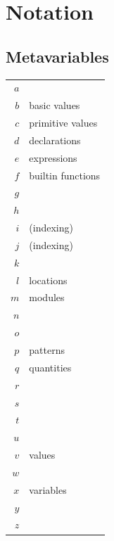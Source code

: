 \section{Notation}

\subsection{Metavariables}

\begin{longtable}[]{@{}rl@{}}
\toprule\noalign{}
\endhead
\bottomrule\noalign{}
\endlastfoot
\(a\) & \\
\(b\) & basic values \\
\(c\) & primitive values \\
\(d\) & declarations \\
\(e\) & expressions \\
\(f\) & builtin functions \\
\(g\) & \\
\(h\) & \\
\(i\) & (indexing) \\
\(j\) & (indexing) \\
\(k\) & \\
\(l\) & locations \\
\(m\) & modules \\
\(n\) & \\
\(o\) & \\
\(p\) & patterns \\
\(q\) & quantities \\
\(r\) & \\
\(s\) & \\
\(t\) & \\
\(u\) & \\
\(v\) & values \\
\(w\) & \\
\(x\) & variables \\
\(y\) & \\
\(z\) & \\
\end{longtable}

